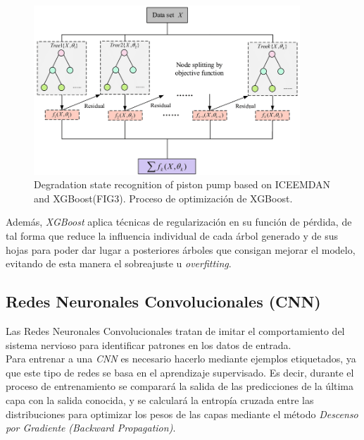             \begin{figure}[h]
                \centering
                \includegraphics[width=10cm]{archivos/XGBoostFlowImage}
                \caption{Degradation state recognition of piston pump based on ICEEMDAN and XGBoost(FIG3). Proceso de optimización de XGBoost.}
                \label{XGBoostFlowImage}
             \end{figure}

            
            Además, \textit{XGBoost} aplica técnicas de regularización en su función de pérdida, de tal forma que reduce la influencia individual de cada árbol generado y de sus hojas para poder dar lugar a posteriores árboles que consigan mejorar el modelo, evitando de esta manera el sobreajuste u \textit{overfitting}.



        \subsection {Redes Neuronales Convolucionales (CNN)}

            Las Redes Neuronales Convolucionales tratan de imitar el comportamiento del sistema nervioso para identificar patrones en los datos de entrada.\\

            Para entrenar a una \textit{CNN} es necesario hacerlo mediante ejemplos etiquetados, ya que este tipo de redes se basa en el aprendizaje supervisado. Es decir, durante el proceso de entrenamiento se comparará la salida de las predicciones de la última capa con la salida conocida, y se calculará la entropía cruzada entre las distribuciones  para optimizar los pesos de las capas mediante el método \textit{Descenso por Gradiente} \textit{(Backward Propagation)}.\\


